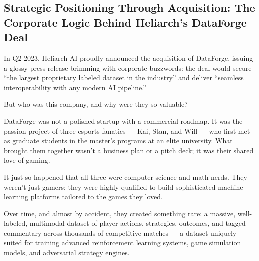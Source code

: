 \subsection{Strategic Positioning Through Acquisition: The Corporate Logic Behind Heliarch’s DataForge Deal}

In Q2 2023, Heliarch AI proudly announced the acquisition of DataForge, issuing a glossy press release brimming with corporate buzzwords:  
the deal would secure “the largest proprietary labeled dataset in the industry” and deliver “seamless interoperability with any modern AI pipeline.”

But who was this company, and why were they so valuable?

DataForge was not a polished startup with a commercial roadmap.  
It was the passion project of three esports fanatics — Kai, Stan, and Will — who first met as graduate students in the master’s programs at an elite university.  
What brought them together wasn’t a business plan or a pitch deck; it was their shared love of gaming.

It just so happened that all three were computer science and math nerds.  
They weren’t just gamers; they were highly qualified to build sophisticated machine learning platforms tailored to the games they loved.

Over time, and almost by accident, they created something rare:  
a massive, well-labeled, multimodal dataset of player actions, strategies, outcomes, and tagged commentary across thousands of competitive matches —  
a dataset uniquely suited for training advanced reinforcement learning systems, game simulation models, and adversarial strategy engines.



\medskip

